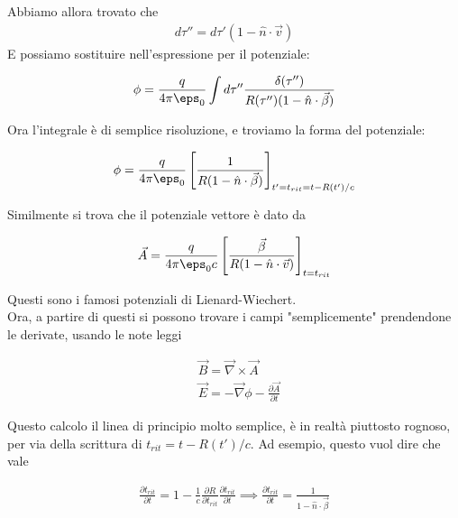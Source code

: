 \documentclass{report}
\begin{document}
Abbiamo allora trovato che 
\begin{align}
    d\tau'' = d\tau'(1 - \hat{n}\cdot\vec{v})
\end{align}
E possiamo sostituire nell'espressione per il potenziale: 

\begin{align}
    \phi = \frac{q}{4\pi \eps_0}\int d\tau'' \frac{\delta(\tau'')}{R(\tau'')(1-\hat{n}\cdot\vec{\beta})}
\end{align}

Ora l'integrale è di semplice risoluzione, e troviamo la forma del potenziale: 
\begin{tcolorbox}[colback=doc!15, colframe=black, boxrule=1pt]
\begin{align}
    \phi = \frac{q}{4\pi \eps_0}\left[\frac{1}{R(1 - \hat{n}\cdot\vec{\beta})}\right]_{t' = t_{rit} = t - R(t')/c}
\end{align}
\end{tcolorbox}

Similmente si trova che il potenziale vettore è dato da 
\begin{tcolorbox}[colback=doc!15, colframe=black, boxrule=1pt]
\begin{align}
    \vec{A} = \frac{q}{4\pi\eps_0 c}\left[\frac{\vec{\beta}}{R(1-\hat{n}\cdot \vec{v})}\right]_{t= t_{rit}}
\end{align}
\end{tcolorbox}

Questi sono i famosi potenziali di Lienard-Wiechert. \\
Ora, a partire di questi si possono trovare i campi "semplicemente" prendendone le derivate, usando le note leggi 

\begin{align}
    &\vec{B} = \vec{\nabla}\times \vec{A} \\
    &\vec{E} = -\vec{\nabla}\phi - \frac{\partial \vec{A}}{\partial t}
\end{align}

Questo calcolo il linea di principio molto semplice, è in realtà piuttosto rognoso, per via della scrittura di \(t_{rit} = t - R(t')/c\). Ad esempio, questo vuol dire che vale 

\begin{align}
    \frac{\partial t_{rit}}{\partial t} = 1 -\frac{1}{c}\frac{\partial R}{\partial t_{rit}}\frac{\partial t_{rit}}{\partial t} \implies \frac{\partial t_{rit}}{\partial t} = \frac{1}{1-\hat{n}\cdot \vec{\beta}}
\end{align}
\end{document}

